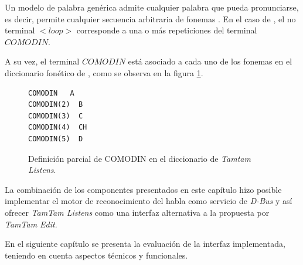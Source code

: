 Un modelo de palabra gen\'erica admite cualquier palabra que pueda pronunciarse, es decir, permite
cualquier secuencia arbitraria de fonemas \cite{Bazzi00Modeling}. 
En el caso de , el no terminal $<loop>$ corresponde a una o m\'as repeticiones del
terminal $COMODIN$.

A su vez, el terminal $COMODIN$ est\'a asociado a cada uno de los fonemas en el diccionario fon\'etico de
, como se observa en la figura \ref{figure:fragmento-comodin}.

\begin{figure}[H]
\begin{lstlisting}
COMODIN   A
COMODIN(2)  B
COMODIN(3)  C
COMODIN(4)  CH
COMODIN(5)  D
\end{lstlisting}
\caption{Definici\'on parcial de COMODIN en el diccionario de \emph{Tamtam Listens}.}
\label{figure:fragmento-comodin}
\end{figure}

La combinaci\'on de los componentes presentados en este cap\'itulo hizo posible implementar el motor 
de reconocimiento del habla como servicio de \emph{D-Bus} y as\'i ofrecer \emph{TamTam Listens} como una 
interfaz alternativa a la propuesta por \emph{TamTam Edit}.

En el siguiente cap\'itulo se presenta la evaluaci\'on de la interfaz implementada, teniendo en cuenta 
aspectos t\'ecnicos y funcionales.